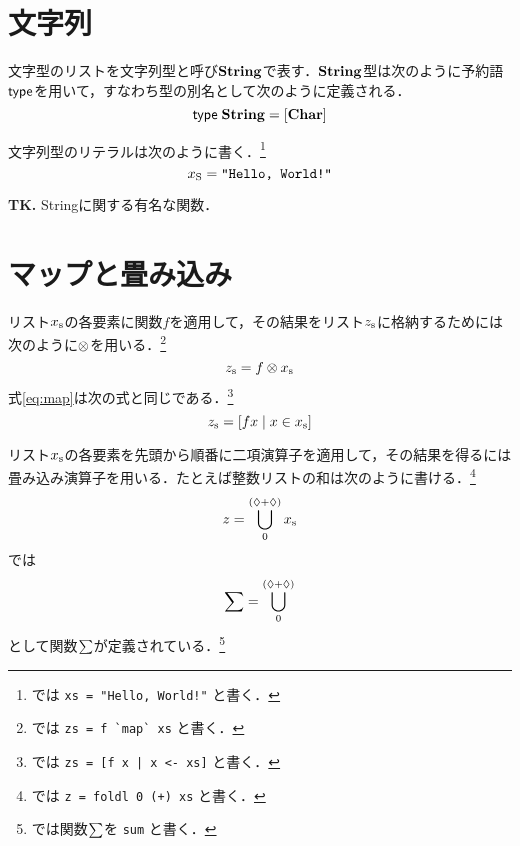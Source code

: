 \documentclass[platex,a5paper,twoside,fleqn,draft]{jsbook}
\newcommand{\keyword}[1]{\textgt{\textbf{#1}}}
\newcommand{\tobewritten}[1]{\begin{screen}\textbf{TK.} {#1}\end{screen}}
\begin{document}
\section{文字列}

文字型のリストを文字列型と呼び$\mathord{\mathbf{String}}$で表す．$\mathord{\mathbf{String}}$型は次のように予約語$\textsf{type}$を用いて，\keyword{型シノニム}すなわち型の別名として次のように定義される．
\begin{equation}
\textsf{type}\;\mathord{\mathbf{String}}=[\mathord{\mathbf{Char}}]
\end{equation}

文字列型のリテラルは次のように書く．\footnote{\haskell では \verb|xs = "Hello, World!"| と書く．}
\begin{equation}
{x}_\mathrm{S}=\mathord{\texttt{"Hello, World!"}}
\end{equation}

\tobewritten{Stringに関する有名な関数．}

\section{マップと畳み込み}

リスト${x}_\mathrm{s}$の各要素に関数$f$を適用して，その結果をリスト${z}_\mathrm{s}$に格納するためには次のように\keyword{マップ演算子}$\otimes$を用いる．\footnote{\haskell では \verb|zs = f `map` xs| と書く．}
\begin{equation}
{z}_\mathrm{s}=f\otimes{x}_\mathrm{s}
\label{eq:map}
\end{equation}
式\eqref{eq:map}は次の式と同じである．\footnote{\haskell では \verb/zs = [f x | x <- xs]/ と書く．}
\begin{equation}
{z}_\mathrm{s}=\left[fx\mid x\in{x}_\mathrm{s}\right]
\end{equation}

リスト${x}_\mathrm{s}$の各要素を先頭から順番に二項演算子を適用して，その結果を得るには畳み込み演算子を用いる．たとえば整数リストの和は次のように書ける．\footnote{\haskell では \verb|z = foldl 0 (+) xs| と書く．}
\begin{equation}
z=\bigcup_{0}^{(\mathord{\lozenge}+\mathord{\lozenge})}{x}_\mathrm{s}
\end{equation}
\haskell では
\begin{equation}
\sum=\bigcup_{0}^{(\mathord{\lozenge}+\mathord{\lozenge})}
\end{equation}
として関数$\sum$が定義されている．\footnote{\haskell では関数$\sum$を \verb|sum| と書く．}
\end{document}
